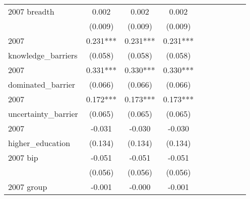 \begin{table}[htbp]
\begin{tabular}{l*{9}{c}}
2007 breadth        &       0.002   &       0.002   &       0.002   &               &               &               &               &               &               \\
                    &     (0.009)   &     (0.009)   &     (0.009)   &               &               &               &               &               &               \\
2007                &       0.231***&       0.231***&       0.231***&               &               &               &               &               &               \\
knowledge\_barriers  &     (0.058)   &     (0.058)   &     (0.058)   &               &               &               &               &               &               \\
2007                &       0.331***&       0.330***&       0.330***&               &               &               &               &               &               \\
dominated\_barrier   &     (0.066)   &     (0.066)   &     (0.066)   &               &               &               &               &               &               \\
2007                &       0.172***&       0.173***&       0.173***&               &               &               &               &               &               \\
uncertainty\_barrier &     (0.065)   &     (0.065)   &     (0.065)   &               &               &               &               &               &               \\
2007                &      -0.031   &      -0.030   &      -0.030   &               &               &               &               &               &               \\
higher\_education    &     (0.134)   &     (0.134)   &     (0.134)   &               &               &               &               &               &               \\
2007 bip            &      -0.051   &      -0.051   &      -0.051   &               &               &               &               &               &               \\
                    &     (0.056)   &     (0.056)   &     (0.056)   &               &               &               &               &               &               \\
2007 group          &      -0.001   &      -0.000   &      -0.001   &               &               &               &               &               &               \\

\end{tabular}
\end{table}
